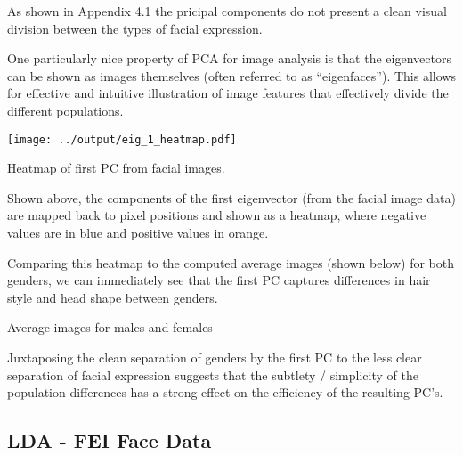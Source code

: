 \documentclass{article}
\begin{document}
\begin{multicols}{2}
  \vspace{1em}
  
  As shown in Appendix 4.1 the pricipal components do not present a clean visual division between the types of facial expression. 
  
  One particularly nice property of PCA for image analysis is that the eigenvectors can be shown as images themselves (often referred to as ``eigenfaces'')\cite{heseltine2003face}. This allows for effective and intuitive illustration of image features that effectively divide the different populations.

  \noindent
  \begin{minipage}{\columnwidth}
    \makeatletter
    \newcommand{\@captype}{figure}
    \makeatother
    \centering
    \texttt{[image: ../output/eig\_1\_heatmap.pdf]}
    \caption{Heatmap of first PC from facial images.}
  \end{minipage}
  
    \vspace{1em}
    Shown above, the components of the first eigenvector (from the facial image data) are mapped back to pixel positions and shown as a heatmap, where negative values are in blue and positive values in orange.
    
    Comparing this heatmap to the computed average images (shown below) for both genders, we can immediately see that the first PC captures differences in hair style and head shape between genders. 
      
  \noindent
  \begin{minipage}{\columnwidth}
    \makeatletter
    \newcommand{\@captype}{figure}
    \makeatother
    \centering
    \qquad%
    \caption{Average images for males and females}
  \end{minipage}
  
  \vspace{1em}
    Juxtaposing the clean separation of genders by the first PC to the less clear separation of facial expression suggests that the subtlety / simplicity of the population differences has a strong effect on the efficiency of the resulting PC's.  
    
  \subsection{LDA - FEI Face Data}
  

\end{multicols}
\end{document}
